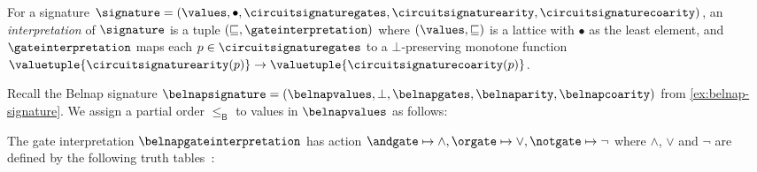 \begin{definition}[Interpretation]
    For a signature \(
    \signature = (
    \values, \bullet, \circuitsignaturegates, \circuitsignaturearity,
    \circuitsignaturecoarity
    )\), an \emph{interpretation} of
    \(\signature\) is a tuple \((\sqsubseteq, \gateinterpretation)\) where
    \((\values, \sqsubseteq)\) is a lattice with \(\bullet\) as the least
    element, and \(\gateinterpretation\) maps each
    \(p \in \circuitsignaturegates\) to a \(\bot\)-preserving monotone function
    \(
    \valuetuple{\circuitsignaturearity(p)}
    \to
    \valuetuple{\circuitsignaturecoarity(p)}
    \).
\end{definition}

\begin{example}\label{ex:belnap-interpretation}
    Recall the Belnap signature \(
    \belnapsignature = (
    \belnapvalues, \bot, \belnapgates, \belnaparity, \belnapcoarity
    )
    \) from \cref{ex:belnap-signature}.
    We assign a partial order \(\leq_\mathsf{B}\) to values in
    \(\belnapvalues\) as follows:

    \begin{center}
    \end{center}

    The gate interpretation \(\belnapgateinterpretation\) has action \(
    \andgate \mapsto \land, \orgate \mapsto \lor, \notgate \mapsto \neg
    \) where \(\land\), \(\lor\) and \(\neg\) are defined by the following
    truth tables~\cite{belnap1977useful}:


\end{example}
